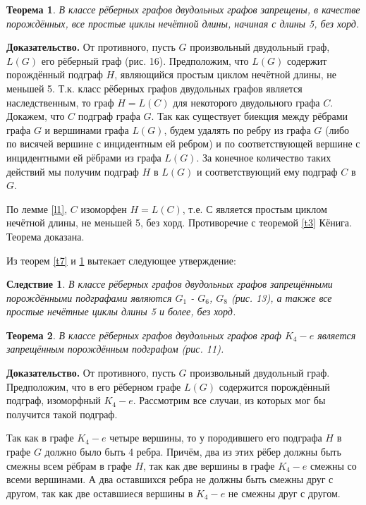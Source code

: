 \documentclass[12pt]{article}
\newtheorem{theorem}{\hspace{1cm}Теорема}
\newtheorem{result}{\hspace{1cm}Следствие}
\begin{document}
	\begin{theorem}
		\label{t10}
		В классе рёберных графов двудольных графов запрещены, в качестве порождённых, все простые циклы нечётной длины, начиная с длины 5,  без хорд.
	\end{theorem}
	{\bf Доказательство.}
	От противного, пусть $G$  произвольный двудольный граф, $L(G)$ его рёберный  граф (рис. 16). Предположим, что $L(G)$ содержит порождённый подграф $H$, являющийся простым циклом нечётной длины, не меньшей 5. %
	Т.к. класс рёберных графов двудольных графов является наследственным, то граф $H=L(C)$ для некоторого двудольного графа $C$. Докажем, что $C$ подграф графа $G$. Так как существует биекция между рёбрами графа $G$ и вершинами графа $L(G)$, будем удалять по ребру из графа $G$ (либо по висячей вершине с инцидентным ей ребром) и по соответствующей вершине с инцидентными ей рёбрами из графа $L(G)$. За конечное количество таких действий мы получим подграф $H$ в $L(G)$ и соответствующий ему подграф $C$ в $G$.
	\par По лемме \ref{l1}, $C$ изоморфен $H=L(C)$, т.е. $С$ является простым циклом нечётной длины, не меньшей 5, без хорд. Противоречие с теоремой \ref{t3} Кёнига. Теорема доказана.
	
	\par
	 Из теорем \ref{t7} и \ref{t10} вытекает следующее утверждение:
	 
	 \begin{result}
	\label{r3}
	В классе рёберных графов двудольных графов запрещёнными порождёнными подграфами являются  $G_1$ - $G_6$, $G_8$ (рис. 13), а также все простые нечётные циклы длины 5 и более, без хорд.
\end{result}
	\vspace{-3mm}

	\begin{theorem}
		\label{t11}
		В классе рёберных графов двудольных графов граф $K_4 - e$ является запрещённым порождённым подграфом (рис. 11).
	\end{theorem}
	{\bf Доказательство.}
	От противного, пусть $G$ произвольный двудольный граф. Предположим, что в его рёберном графе $L(G)$ содержится порождённый подграф, изоморфный $K_4 - e$. Рассмотрим все случаи, из которых мог бы получится такой подграф.
	
	Так как в графе $K_4 - e$ четыре вершины, то у породившего его подграфа $H$ в графе $G$ должно было быть 4 ребра. Причём, два из этих рёбер должны быть смежны всем рёбрам в графе $H$, так как две вершины в графе $K_4 - e$ смежны со всеми вершинами. А два оставшихся ребра не должны быть смежны друг с другом, так как две оставшиеся вершины в $K_4 - e$ не смежны друг с другом.
	
\end{document}
